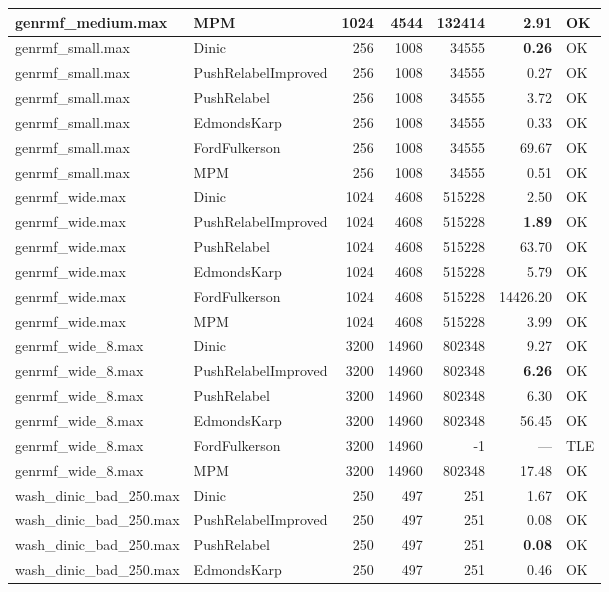 \begin{longtable}{llrrrrl}
genrmf\_medium.max & MPM & 1024 & 4544 & 132414 & 2.91 & OK \\
\midrule
genrmf\_small.max & Dinic & 256 & 1008 & 34555 & \textbf{0.26} & OK \\
genrmf\_small.max & PushRelabelImproved & 256 & 1008 & 34555 & 0.27 & OK \\
genrmf\_small.max & PushRelabel & 256 & 1008 & 34555 & 3.72 & OK \\
genrmf\_small.max & EdmondsKarp & 256 & 1008 & 34555 & 0.33 & OK \\
genrmf\_small.max & FordFulkerson & 256 & 1008 & 34555 & 69.67 & OK \\
genrmf\_small.max & MPM & 256 & 1008 & 34555 & 0.51 & OK \\
\midrule
genrmf\_wide.max & Dinic & 1024 & 4608 & 515228 & 2.50 & OK \\
genrmf\_wide.max & PushRelabelImproved & 1024 & 4608 & 515228 & \textbf{1.89} & OK \\
genrmf\_wide.max & PushRelabel & 1024 & 4608 & 515228 & 63.70 & OK \\
genrmf\_wide.max & EdmondsKarp & 1024 & 4608 & 515228 & 5.79 & OK \\
genrmf\_wide.max & FordFulkerson & 1024 & 4608 & 515228 & 14426.20 & OK \\
genrmf\_wide.max & MPM & 1024 & 4608 & 515228 & 3.99 & OK \\
\midrule
genrmf\_wide\_8.max & Dinic & 3200 & 14960 & 802348 & 9.27 & OK \\
genrmf\_wide\_8.max & PushRelabelImproved & 3200 & 14960 & 802348 & \textbf{6.26} & OK \\
genrmf\_wide\_8.max & PushRelabel & 3200 & 14960 & 802348 & 6.30 & OK \\
genrmf\_wide\_8.max & EdmondsKarp & 3200 & 14960 & 802348 & 56.45 & OK \\
genrmf\_wide\_8.max & FordFulkerson & 3200 & 14960 & -1 & --- & TLE \\
genrmf\_wide\_8.max & MPM & 3200 & 14960 & 802348 & 17.48 & OK \\
\midrule
wash\_dinic\_bad\_250.max & Dinic & 250 & 497 & 251 & 1.67 & OK \\
wash\_dinic\_bad\_250.max & PushRelabelImproved & 250 & 497 & 251 & 0.08 & OK \\
wash\_dinic\_bad\_250.max & PushRelabel & 250 & 497 & 251 & \textbf{0.08} & OK \\
wash\_dinic\_bad\_250.max & EdmondsKarp & 250 & 497 & 251 & 0.46 & OK \\

\end{longtable}
